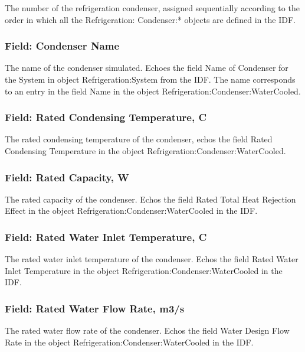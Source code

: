 The number of the refrigeration condenser, assigned sequentially according to the order in which all the Refrigeration: Condenser:* objects are defined in the IDF.

\subsubsection{Field: Condenser Name}\label{field-condenser-name-2}

The name of the condenser simulated. Echoes the field Name of Condenser for the System in object Refrigeration:System from the IDF. The name corresponds to an entry in the field Name in the object Refrigeration:Condenser:WaterCooled.

\subsubsection{Field: Rated Condensing Temperature, C}\label{field-rated-condensing-temperature-c-1}

The rated condensing temperature of the condenser, echos the field Rated Condensing Temperature in the object Refrigeration:Condenser:WaterCooled.

\subsubsection{Field: Rated Capacity, W}\label{field-rated-capacity-w-1}

The rated capacity of the condenser. Echos the field Rated Total Heat Rejection Effect in the object Refrigeration:Condenser:WaterCooled in the IDF.

\subsubsection{Field: Rated Water Inlet Temperature, C}\label{field-rated-water-inlet-temperature-c}

The rated water inlet temperature of the condenser. Echos the field Rated Water Inlet Temperature in the object Refrigeration:Condenser:WaterCooled in the IDF.

\subsubsection{Field: Rated Water Flow Rate, m3/s}\label{field-rated-water-flow-rate-m3s}

The rated water flow rate of the condenser. Echos the field Water Design Flow Rate in the object Refrigeration:Condenser:WaterCooled in the IDF.


